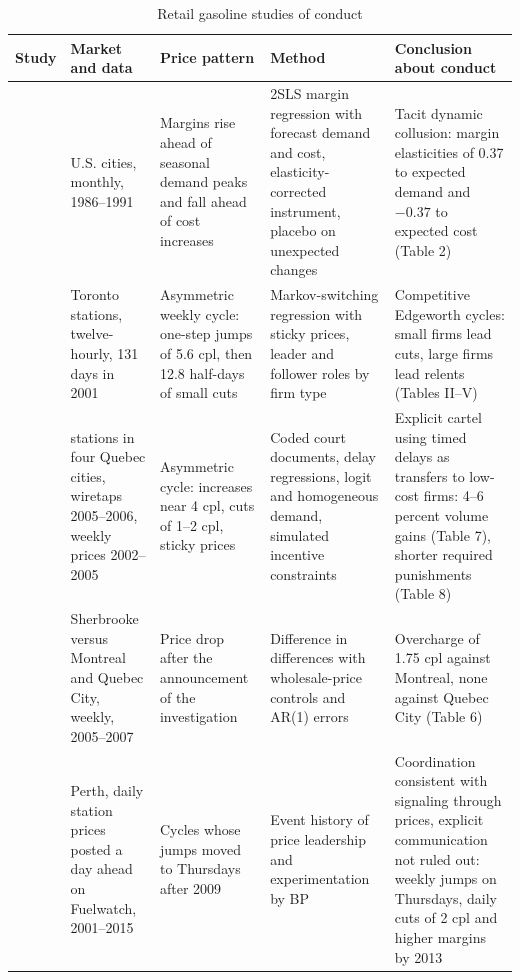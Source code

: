 \begin{table}[htbp]
\centering
\caption{Retail gasoline studies of conduct}\label{tab:13-gas-synthesis}
\footnotesize
\begin{tabularx}{\textwidth}{>{\raggedright\arraybackslash}p{2.0cm}>{\raggedright\arraybackslash}p{2.3cm}>{\raggedright\arraybackslash}X>{\raggedright\arraybackslash}X>{\raggedright\arraybackslash}X}
\toprule
Study & Market and data & Price pattern & Method & Conclusion about conduct\\
\midrule
\citet{BorensteinShepard1996} & 59 U.S. cities, monthly, 1986--1991 & Margins rise ahead of seasonal demand peaks and fall ahead of cost increases & 2SLS margin regression with forecast demand and cost, elasticity-corrected instrument, placebo on unexpected changes & Tacit dynamic collusion: margin elasticities of 0.37 to expected demand and $-0.37$ to expected cost (Table 2)\\
\addlinespace
\citet{Noel2007} & 22 Toronto stations, twelve-hourly, 131 days in 2001 & Asymmetric weekly cycle: one-step jumps of 5.6 cpl, then 12.8 half-days of small cuts & Markov-switching regression with sticky prices, leader and follower roles by firm type & Competitive Edgeworth cycles: small firms lead cuts, large firms lead relents (Tables II--V)\\
\addlinespace
\citet{ClarkHoude2013} & 128 stations in four Quebec cities, wiretaps 2005--2006, weekly prices 2002--2005 & Asymmetric cycle: increases near 4 cpl, cuts of 1--2 cpl, sticky prices & Coded court documents, delay regressions, logit and homogeneous demand, simulated incentive constraints & Explicit cartel using timed delays as transfers to low-cost firms: 4--6 percent volume gains (Table 7), shorter required punishments (Table 8)\\
\addlinespace
\citet{ErutkuHildebrand2010} & Sherbrooke versus Montreal and Quebec City, weekly, 2005--2007 & Price drop after the announcement of the investigation & Difference in differences with wholesale-price controls and AR(1) errors & Overcharge of 1.75 cpl against Montreal, none against Quebec City (Table 6)\\
\addlinespace
\citet{ByrneDeRoos2019} & Perth, daily station prices posted a day ahead on Fuelwatch, 2001--2015 & Cycles whose jumps moved to Thursdays after 2009 & Event history of price leadership and experimentation by BP & Coordination consistent with signaling through prices, explicit communication not ruled out: weekly jumps on Thursdays, daily cuts of 2 cpl and higher margins by 2013\\
\bottomrule
\end{tabularx}
\end{table}


